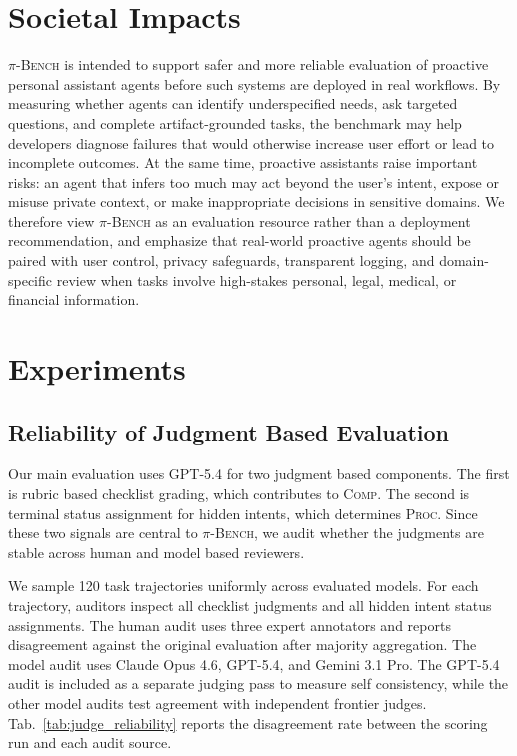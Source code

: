 \documentclass{llmxive}
\providecommand{\bench}{\textsc{$\pi$-Bench}}
\begin{document}
\section{Societal Impacts}
\label{app:societal_impacts}

{\bench} is intended to support safer and more reliable evaluation of proactive personal assistant agents before such systems are deployed in real workflows. By measuring whether agents can identify underspecified needs, ask targeted questions, and complete artifact-grounded tasks, the benchmark may help developers diagnose failures that would otherwise increase user effort or lead to incomplete outcomes. At the same time, proactive assistants raise important risks: an agent that infers too much may act beyond the user's intent, expose or misuse private context, or make inappropriate decisions in sensitive domains. We therefore view {\bench} as an evaluation resource rather than a deployment recommendation, and emphasize that real-world proactive agents should be paired with user control, privacy safeguards, transparent logging, and domain-specific review when tasks involve high-stakes personal, legal, medical, or financial information.


\section{Experiments}
\label{app:experiments}

\subsection{Reliability of Judgment Based Evaluation}
\label{app:judge_reliability}

Our main evaluation uses GPT-5.4 for two judgment based components. The first is rubric based checklist grading, which contributes to \textsc{Comp}. The second is terminal status assignment for hidden intents, which determines \textsc{Proc}. Since these two signals are central to {\bench}, we audit whether the judgments are stable across human and model based reviewers.

We sample 120 task trajectories uniformly across evaluated models. For each trajectory, auditors inspect all checklist judgments and all hidden intent status assignments. The human audit uses three expert annotators and reports disagreement against the original evaluation after majority aggregation. The model audit uses Claude Opus 4.6, GPT-5.4, and Gemini 3.1 Pro. The GPT-5.4 audit is included as a separate judging pass to measure self consistency, while the other model audits test agreement with independent frontier judges. Tab.~\ref{tab:judge_reliability} reports the disagreement rate between the scoring run and each audit source.
\end{document}
